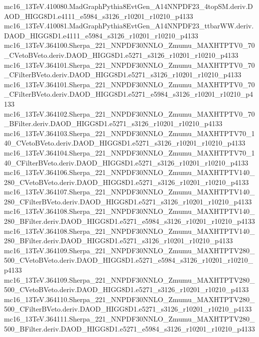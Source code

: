 mc16_13TeV.410080.MadGraphPythia8EvtGen_A14NNPDF23_4topSM.deriv.DAOD_HIGG8D1.e4111_e5984_s3126_r10201_r10210_p4133 \\
mc16_13TeV.410081.MadGraphPythia8EvtGen_A14NNPDF23_ttbarWW.deriv.DAOD_HIGG8D1.e4111_e5984_s3126_r10201_r10210_p4133 \\
mc16_13TeV.364100.Sherpa_221_NNPDF30NNLO_Zmumu_MAXHTPTV0_70_CVetoBVeto.deriv.DAOD_HIGG8D1.e5271_s3126_r10201_r10210_p4133 \\
mc16_13TeV.364101.Sherpa_221_NNPDF30NNLO_Zmumu_MAXHTPTV0_70_CFilterBVeto.deriv.DAOD_HIGG8D1.e5271_s3126_r10201_r10210_p4133 \\
mc16_13TeV.364101.Sherpa_221_NNPDF30NNLO_Zmumu_MAXHTPTV0_70_CFilterBVeto.deriv.DAOD_HIGG8D1.e5271_e5984_s3126_r10201_r10210_p4133 \\
mc16_13TeV.364102.Sherpa_221_NNPDF30NNLO_Zmumu_MAXHTPTV0_70_BFilter.deriv.DAOD_HIGG8D1.e5271_s3126_r10201_r10210_p4133 \\
mc16_13TeV.364103.Sherpa_221_NNPDF30NNLO_Zmumu_MAXHTPTV70_140_CVetoBVeto.deriv.DAOD_HIGG8D1.e5271_s3126_r10201_r10210_p4133 \\
mc16_13TeV.364104.Sherpa_221_NNPDF30NNLO_Zmumu_MAXHTPTV70_140_CFilterBVeto.deriv.DAOD_HIGG8D1.e5271_s3126_r10201_r10210_p4133 \\
mc16_13TeV.364106.Sherpa_221_NNPDF30NNLO_Zmumu_MAXHTPTV140_280_CVetoBVeto.deriv.DAOD_HIGG8D1.e5271_s3126_r10201_r10210_p4133 \\
mc16_13TeV.364107.Sherpa_221_NNPDF30NNLO_Zmumu_MAXHTPTV140_280_CFilterBVeto.deriv.DAOD_HIGG8D1.e5271_s3126_r10201_r10210_p4133 \\
mc16_13TeV.364108.Sherpa_221_NNPDF30NNLO_Zmumu_MAXHTPTV140_280_BFilter.deriv.DAOD_HIGG8D1.e5271_e5984_s3126_r10201_r10210_p4133 \\
mc16_13TeV.364108.Sherpa_221_NNPDF30NNLO_Zmumu_MAXHTPTV140_280_BFilter.deriv.DAOD_HIGG8D1.e5271_s3126_r10201_r10210_p4133 \\
mc16_13TeV.364109.Sherpa_221_NNPDF30NNLO_Zmumu_MAXHTPTV280_500_CVetoBVeto.deriv.DAOD_HIGG8D1.e5271_e5984_s3126_r10201_r10210_p4133 \\
mc16_13TeV.364109.Sherpa_221_NNPDF30NNLO_Zmumu_MAXHTPTV280_500_CVetoBVeto.deriv.DAOD_HIGG8D1.e5271_s3126_r10201_r10210_p4133 \\
mc16_13TeV.364110.Sherpa_221_NNPDF30NNLO_Zmumu_MAXHTPTV280_500_CFilterBVeto.deriv.DAOD_HIGG8D1.e5271_s3126_r10201_r10210_p4133 \\
mc16_13TeV.364111.Sherpa_221_NNPDF30NNLO_Zmumu_MAXHTPTV280_500_BFilter.deriv.DAOD_HIGG8D1.e5271_e5984_s3126_r10201_r10210_p4133 \\

